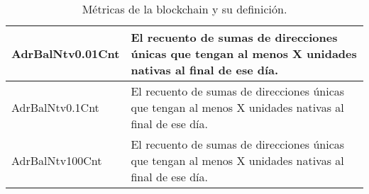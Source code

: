 \begin{table}[h!]
\begin{tabular}{|l|m{12cm}|}
		AdrBalNtv0.01Cnt  & El recuento de sumas de direcciones únicas que tengan al menos X unidades nativas al final de ese día.                                       \\
		\hline
		AdrBalNtv0.1Cnt   & El recuento de sumas de direcciones únicas que tengan al menos X unidades nativas al final de ese día.                                       \\
		\hline
		AdrBalNtv100Cnt   & El recuento de sumas de direcciones únicas que tengan al menos X unidades nativas al final de ese día.\\
		\hline
	\end{tabular}
	\caption{Métricas de la blockchain y su definición.}
	\label{tab:TableAppen1}                                     
\end{table}

